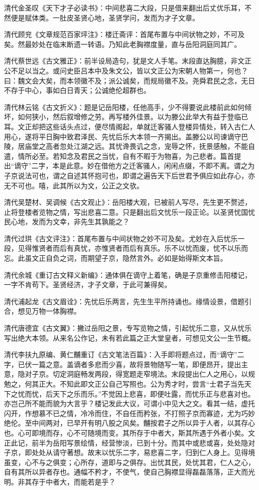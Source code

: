 \documentclass[letterpaper,12pt,english]{sphinxmanual}
\begin{document}
清代金圣叹《天下才子必读书》：中间悲喜二大段，只是借来翻出后丈优乐耳，不然便是赋体类。一肚皮圣贤心地，圣贤学问，发而为才子文章。

清代顾兖《文章规范百家坪注》：楼迁斋评：首尾布置与中间状物之妙，不可及矣。然最妙处在临末断遗一转语。乃知此老胸襟度量，直与岳阳洞庭同其广。

清代蔡世远《古文雅正》：前半设局造句，犹是文人手笔。末段直达胸臆，非文正公不足以当之。或问史臣吕本中及朱文公，皆以文正公为宋朝人物第一，何也？曰：魏文会大矣，而本领徽不及；派公诚矣，而规局徽不及。尧舜君民之念，无日不存于中心，事如白日青天；公诚绝伦超群也。

清代林云铭《古文折义》：题是记岳阳楼，任他高手，少不得要说此楼前此如何倾坏，如何狭小，然后叙增修之劳。再写楼外佳景。以为滕公此举大有益于登临已耳。文正却把这些话头点过，便尽情阁起，单就迁客骚人登楼异情处，转入古仁人用心，遂将平日胸中致君泽民、先忧后乐大本领一齐揭出。盖滕公以司谏谪守巴陵，居庙堂之高者忽处江湖之远。其忧谗畏讥之念，宠辱之怀，抚景感触，不能自遣，情所必至。若知念及君民之当忧，自有不暇于为物喜，为己悲者。篇首提出“谪守”二字，本是此意。妙在借他方之迁客骚人，闲闲点缀，不即不离。谓之为子京说法可也，谓之自述其怀抱可也，即谓之遍告天下后世君予俱应如此存心，亦无不可也。嘻，此其所以为文，公正之文欤。

清代吴楚材、吴调候《古文观止》：岳阳楼大观，已被前人写尽，先生更不赘述，止将登楼者览物之情，写出悲喜二意。只是翻出后文忧乐一段正论。以圣贤忧国忧民心地，发而为文幸，非先生其孰能之？

清代过珙《古文评注》：首尾布置与中间状物之妙不可及矣。尤妙在入后忧乐一段，见得惟贤者而后有真忧，亦惟贤者而后有真乐。乐不以忧而废，忧不以乐而忘。此虽文正自负之词，而期望子京，隐然言外。必如是始得斯文本旨。

清代余城《重订古文释义新编》：通体俱在谪守上着笔，确是子京重修击阳楼记，一字不肯苟下。圣贤经济，才子文章，于此可兼得矣。

清代浦起龙《古文眉诠》：先忧后乐两言，先生生平所持诵也。缘情设景，借题引合，想见万物一体胸襟。

清代唐德宜《古文翼》：撇过岳阳之景，专写览物之情，引起忧乐二意，又从忧乐写出绝大本领。从来名公作记，未有若此篇之正大堂皇者，可想见文公一生节概。

清代李扶九原编、黄仁黼重订《古文笔法百篇》：入手即将题点过，而“谪守”二字，已伏一篇之意。盖谪者多悲而少喜，故将景物随写一笔，即便昂开，提出主意，隐对子京。切定洞庭畅发两段，得宽题走窄境法。末段提出仁人之用心，以规勉之，何其正大。不知此即文正公自己写照也。公为秀才时，尝言“士君子当先天下之忧而忧，后天下之乐而乐。”不觉因上悲喜，即便吐露，而忧乐正与悲喜对也。亦岂己所不能而貌为大言乎？楼记发此大议，可谓小中见大之文。看其一结，虚托闪开，作想慕不已之情，冷冷而住，不自任而矜张，不打照子京而寡迹，尤为巧妙绝伦。至中间两对，已早开有明八股之风矣。黼按君子之所以异于人者，以其存心也。心可即境而存，心不可随境而变。其所存于中者大，斯其所遇于外者小矣。文正此记，前半为岳阳写景绘情，经营惨淡，已到十分。而其中或悲或喜，处处隐对子京，即处处从请守著想。故末以忧乐二字，易悲喜二字，归到仁人身上。见得境虽变，心不与之俱变；心所存，道即与之俱存。出忧其民，处忧其君，仁人之心，自有其所以异者存也。通幅不矜才，不使气，使自己胸襟显得磊磊落落，正大而光明。非其存于中者大，而能若是乎？
\end{document}
